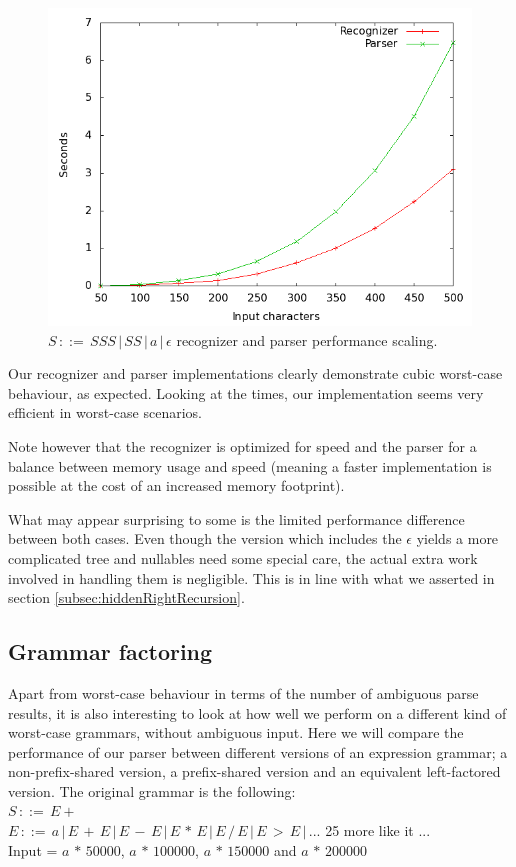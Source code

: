 \documentclass[a4paper,10pt]{article}
\begin{document}
\begin{figure}[H]
\centering
\includegraphics[scale=0.4]{worst-case_with-epsilon.png}
\caption{$S\,::=\,SSS\,|\,SS\,|\,a\,|\,\epsilon$ recognizer and parser performance scaling.}
\end{figure}

Our recognizer and parser implementations clearly demonstrate cubic worst-case behaviour, as expected. Looking at the times, our implementation seems very efficient in worst-case scenarios.

Note however that the recognizer is optimized for speed and the parser for a balance between memory usage and speed (meaning a faster implementation is possible at the cost of an increased memory footprint).

What may appear surprising to some is the limited performance difference between both cases. Even though the version which includes the $\epsilon$ yields a more complicated tree and nullables need some special care, the actual extra work involved in handling them is negligible. This is in line with what we asserted in section \ref{subsec:hiddenRightRecursion}.

\subsection{Grammar factoring}
\label{sec:factoringBenchmark}

Apart from worst-case behaviour in terms of the number of ambiguous parse results, it is also interesting to look at how well we perform on a different kind of worst-case grammars, without ambiguous input. Here we will compare the performance of our parser between different versions of an expression grammar; a non-prefix-shared version, a prefix-shared version and an equivalent left-factored version. The original grammar is the following:\\
$S\,::=\,E+$\\
$E\,::=\,a\,|\,E\,+\,E\,|\,E\,-\,E\,|\,E\,*\,E\,|\,E\,/\,E\,|\,E\,>\,E\,|\,...$ 25 more like it ...\\
Input = $a\,*\,50000$, $a\,*\,100000$, $a\,*\,150000$ and $a\,*\,200000$
\end{document}
